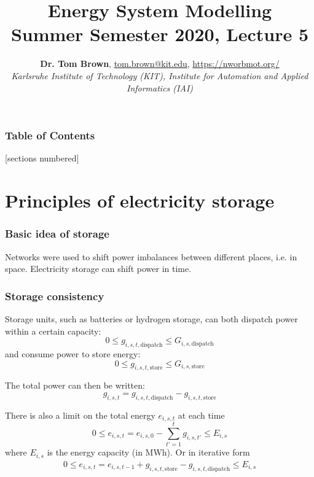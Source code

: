 \documentclass[10pt,aspectratio=169,dvipsnames]{beamer}
\title{Energy System Modelling\\ Summer Semester 2020, Lecture 5}
\author{
  {\bf Dr. Tom Brown}, \href{mailto:tom.brown@kit.edu}{tom.brown@kit.edu}, \url{https://nworbmot.org/}\\
  \emph{Karlsruhe Institute of Technology (KIT), Institute for Automation and Applied Informatics (IAI)}
}
\date{}
\begin{document}
\maketitle


\begin{frame}

  \frametitle{Table of Contents}
  [sections numbered]
  \tableofcontents[hideallsubsections]
\end{frame}


\section{Principles of electricity storage}


\begin{frame}
  \frametitle{Basic idea of storage}

  Networks were used to shift power imbalances between different
  places, i.e. in \alert{space}. Electricity storage can shift power in \alert{time}.

  \vspace{0.5cm}


\end{frame}

\begin{frame}
  \frametitle{Storage consistency}

  Storage units, such as batteries or hydrogen storage, can both
  dispatch power within a certain capacity:
  \begin{equation*}
    0 \leq g_{i,s,t,\textrm{dispatch}} \leq G_{i,s,\textrm{dispatch}}
  \end{equation*}
  and consume power to store energy:
  \begin{equation*}
    0 \leq g_{i,s,t,\textrm{store}} \leq G_{i,s,\textrm{store}}
  \end{equation*}

  The total power can then be written:
  \begin{equation*}
    g_{i,s,t} = g_{i,s,t,\textrm{dispatch}}  - g_{i,s,t,\textrm{store}}
  \end{equation*}

  There is also a limit on the total energy $e_{i,s,t}$ at each time
  \begin{equation*}
    0 \leq e_{i,s,t} = e_{i,s,0} -\sum_{t'=1}^{t} g_{i,s,t'} \leq E_{i,s}
  \end{equation*}
  where $E_{i,s}$ is the energy capacity (in MWh). Or in iterative form
  \begin{align*}
    0 \leq e_{i,s,t} = e_{i,s,t-1} + g_{i,s,t,\textrm{store}} -  g_{i,s,t,\textrm{dispatch}} \leq E_{i,s}
  \end{align*}

\end{frame}
\end{document}
